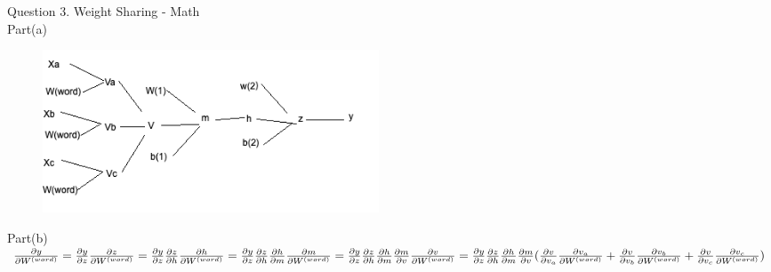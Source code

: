 \documentclass[12pt]{article}
\begin{document}
Question 3. Weight Sharing - Math\\
Part(a) \\
\begin{figure}[H]
    \centering
    \includegraphics[width=100mm,scale=1]{3}\

\end{figure}

Part(b)\\
$\frac{\partial y}{\partial W^{(word)}} =\frac{\partial y}{\partial z}\frac{\partial z}{\partial W^{(word)}}= \frac{\partial y}{\partial z}\frac{\partial z}{\partial h}\frac{\partial h}{\partial W^{(word)}}\\
 = \frac{\partial y}{\partial z}\frac{\partial z}{\partial h}\frac{\partial h}{\partial m}\frac{\partial m}{\partial W^{(word)}} 
= \frac{\partial y}{\partial z}\frac{\partial z}{\partial h}\frac{\partial h}{\partial m}\frac{\partial m}{\partial v} \frac{\partial v}{\partial W^{(word)}}\\ =
 \frac{\partial y}{\partial z} \frac{\partial z}{\partial h} \frac{\partial h}{\partial m}\frac{\partial m}{\partial v} (\frac{\partial v}{\partial v_a}\frac{\partial v_a}{\partial W^{(word)}} + \frac{\partial v}{\partial v_b}\frac{\partial v_b}{\partial W^{(word)}} +\frac{\partial v}{\partial v_c}\frac{\partial v_c}{\partial W^{(word)}})$\\
\end{document}
